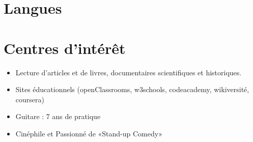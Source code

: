\documentclass[11pt,a4paper,sans]{moderncv}
\begin{document}
\section{Langues}

\section{Centres d'intérêt}
\begin{itemize}
  \item[\color{blue}{$\circ$}]Lecture d'articles et de livres, documentaires scientifiques et historiques.
  \item[\color{blue}{$\circ$}]Sites éducationnels (openClassrooms, w3schools, codeacademy, wikiversité, coursera)
  \item[\color{blue}{$\circ$}]Guitare : 7 ans de pratique
  \item[\color{blue}{$\circ$}]Cinéphile et Passionné de «Stand-up Comedy»
\end{itemize}
\end{document}
